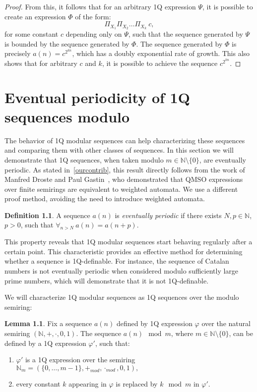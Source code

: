 \documentclass[en]{pracamgr}
\theoremstyle{definition}
\newtheorem{definition}{Definition}[section]
\newtheorem{lemma}[theorem]{Lemma}
\begin{document}
\begin{proof}
    From this, it follows that for an arbitrary 1Q expression $\varPsi$, it is possible to create an expression $\varPhi$ of the form:
    $$\Pi_{X_1}\Pi_{X_2}\ldots \Pi_{X_k} \ c,$$
    for some constant $c$ depending only on $\varPsi$, such that the sequence generated by $\varPsi$ is bounded by the sequence generated by $\varPhi$. The sequence generated by $\varPhi$ is precisely $a(n) = c^{2^{kn}}$, which has a doubly exponential rate of growth. This also shows that for arbitrary $c$ and $k$, it is possible to achieve the sequence $c^{2^{kn}}$.
\end{proof}

\chapter{Eventual periodicity of 1Q sequences modulo}
\label{Sec1QFiniteSemirings}
The behavior of 1Q modular sequences can help characterizing these sequences and comparing them with other classes of sequences. In this section we will demonstrate that 1Q sequences, when taken modulo $m \in \mathbb{N} \setminus \{0\}$, are eventually periodic. As stated in~\cref{ourcontrib}, this result directly follows from the work of Manfred Droste and Paul Gastin~\cite{DrosteG07}, who demonstrated that QMSO expressions over finite semirings are equivalent to weighted automata. We use a different proof method, avoiding the need to introduce weighted automata.

\begin{definition}
    A sequence $a(n)$ is \textit{eventually periodic} if there exists $N, p \in \mathbb{N}$, $p > 0$, such that $\forall_{n > N} \ a(n) = a(n+p)$.
\end{definition}

This property reveals that 1Q modular sequences start behaving regularly after a certain point. This characteristic provides an effective method for determining whether a sequence is 1Q-definable. For instance, the sequence of Catalan numbers is not eventually periodic when considered modulo sufficiently large prime numbers, which will demonstrate that it is not 1Q-definable.

We will characterize 1Q modular sequences as 1Q sequences over the modulo semiring:

\begin{lemma}
    \label{1QModulo}
    Fix a sequence $a(n)$ defined by 1Q expression $\varphi$ over the natural semiring $(\mathbb{N}, +, \cdot, 0, 1)$. The sequence $a(n) \mod m$, where $m \in \mathbb{N} \setminus \{0\}$, can be defined by a 1Q expression $\varphi'$, such that:
    \begin{enumerate}
        \item $\varphi'$ is a 1Q expression over the semiring $\mathbb{N}_m = (\{0,\ldots,m-1\}, +_{mod}, \cdot_{mod}, 0, 1),$
        \item every constant $k$ appearing in $\varphi$ is replaced by $k \mod m$ in $\varphi'.$
    \end{enumerate}
\end{lemma}
\end{document}
